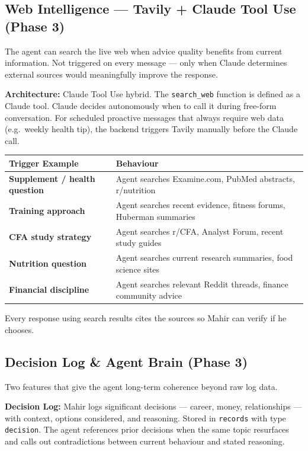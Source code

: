\documentclass[12pt, a4paper]{article}
\begin{document}
\subsection{Web Intelligence --- Tavily + Claude Tool Use (Phase 3)}

The agent can search the live web when advice quality benefits from current information. Not triggered on every message --- only when Claude determines external sources would meaningfully improve the response.

\textbf{Architecture:} Claude Tool Use hybrid. The \texttt{search\_web} function is defined as a Claude tool. Claude decides autonomously when to call it during free-form conversation. For scheduled proactive messages that always require web data (e.g.\ weekly health tip), the backend triggers Tavily manually before the Claude call.

\begin{longtable}{>{\bfseries}p{4cm} p{10cm}}
\toprule
Trigger Example & Behaviour \\
\midrule
Supplement / health question & Agent searches Examine.com, PubMed abstracts, r/nutrition \\
\addlinespace
Training approach & Agent searches recent evidence, fitness forums, Huberman summaries \\
\addlinespace
CFA study strategy & Agent searches r/CFA, Analyst Forum, recent study guides \\
\addlinespace
Nutrition question & Agent searches current research summaries, food science sites \\
\addlinespace
Financial discipline & Agent searches relevant Reddit threads, finance community advice \\
\bottomrule
\end{longtable}

Every response using search results cites the sources so Mahir can verify if he chooses.

\subsection{Decision Log \& Agent Brain (Phase 3)}

Two features that give the agent long-term coherence beyond raw log data.

\textbf{Decision Log:} Mahir logs significant decisions --- career, money, relationships --- with context, options considered, and reasoning. Stored in \texttt{records} with type \texttt{decision}. The agent references prior decisions when the same topic resurfaces and calls out contradictions between current behaviour and stated reasoning.
\end{document}
